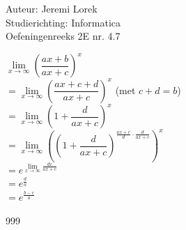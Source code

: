 \documentclass[a4paper]{article}
\begin{document}
  
\noindent \large Auteur: Jeremi Lorek\\
\noindent \large Studierichting: Informatica\\
\noindent \large Oefeningenreeks 2E nr. 4.7\\

\medskip
\normalsize

$\lim\limits_{x \to \infty} \left( \dfrac{ax + b}{ax + c} \right)^x$  \\

$= \lim\limits_{x \to \infty} \left( \dfrac{ax + c + d}{ax + c} \right)^x$ \quad (met $c + d = b$)  \\

$= \lim\limits_{x \to \infty} \left( 1 + \dfrac{d}{ax + c} \right)^x$  \\

$= \lim\limits_{x \to \infty} \left(\left( 1 + \dfrac{d}{ax + c} \right)^{\tfrac{ax+c}{d} \cdot \tfrac{d}{ax+c}}\right)^x$  \\

$= e^{\lim\limits_{x \to \infty} \tfrac{dx}{ax+c}}$  \\

$= e^{\tfrac{d}{a}} $ \\

$= e^{\tfrac{b-c}{a}}$  \\



\begin{thebibliography}{999}
\end{thebibliography}
\end{document}
